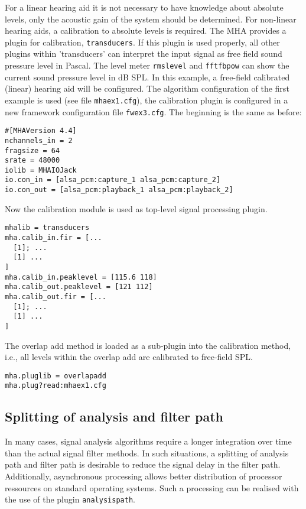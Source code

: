 For a linear hearing aid it is not necessary to have knowledge about
absolute levels, only the acoustic gain of the system should be
determined.
%
For non-linear hearing aids, a calibration to absolute levels is required.
%
The MHA provides a plugin for calibration, {\tt transducers}.
%
If this plugin is used properly, all other plugins within 'transducers'
can interpret the input signal as free field sound pressure level in
Pascal.
%
The level meter {\tt rmslevel} and {\tt fftfbpow} can show the current
sound pressure level in dB SPL.
%
In this example, a free-field calibrated (linear) hearing aid will be
configured.
%
The algorithm configuration of the first example is used (see file
\verb!mhaex1.cfg!), the calibration plugin is configured in a new
framework configuration file \verb!fwex3.cfg!.
%
The beginning is the same as before:
\begin{verbatim}
#[MHAVersion 4.4]
nchannels_in = 2
fragsize = 64
srate = 48000
iolib = MHAIOJack
io.con_in = [alsa_pcm:capture_1 alsa_pcm:capture_2]
io.con_out = [alsa_pcm:playback_1 alsa_pcm:playback_2]
\end{verbatim}
Now the calibration module is used as top-level signal processing
plugin.
%
\begin{verbatim}
mhalib = transducers
mha.calib_in.fir = [...
  [1]; ...
  [1] ...
]
mha.calib_in.peaklevel = [115.6 118]
mha.calib_out.peaklevel = [121 112]
mha.calib_out.fir = [...
  [1]; ...
  [1] ...
]
\end{verbatim}
The overlap add method is loaded as a sub-plugin into the calibration
method, i.e., all levels within the overlap add are calibrated to
free-field SPL.
\begin{verbatim}
mha.pluglib = overlapadd
mha.plug?read:mhaex1.cfg
\end{verbatim}

\subsection{Splitting of analysis and filter path}%
\label{sec:split_analysis}%
%
%

In many cases, signal analysis algorithms require a longer integration
over time than the actual signal filter methods.
%
In such situations, a splitting of analysis path and filter path is
desirable to reduce the signal delay in the filter path.
%
Additionally, asynchronous processing allows better distribution of
processor ressources on standard operating systems.
%
Such a processing can be realised with the use of the plugin
{\tt analysispath}.

